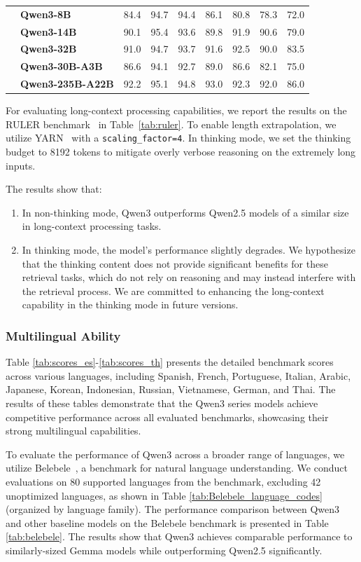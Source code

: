 \begin{table}[h]
\begin{tabular}{@{}cllllllll@{}}
& \textbf{Qwen3-8B} & 84.4 & 94.7 & 94.4 & 86.1 & 80.8 & 78.3 & 72.0 \\
& \textbf{Qwen3-14B} & 90.1 & 95.4 & 93.6 & 89.8 & 91.9 & 90.6 & 79.0 \\
& \textbf{Qwen3-32B} & 91.0 & 94.7 & 93.7 & 91.6 & 92.5 & 90.0 & 83.5 \\
& \textbf{Qwen3-30B-A3B} & 86.6 & 94.1 & 92.7 & 89.0 & 86.6 & 82.1 & 75.0 \\
& \textbf{Qwen3-235B-A22B} & 92.2 & 95.1 & 94.8 & 93.0 & 92.3 & 92.0 & 86.0 \\
\bottomrule
\end{tabular}
\end{table}

For evaluating long-context processing capabilities, we report the results on the RULER benchmark~\citep{hsieh2024ruler} in Table~\ref{tab:ruler}. To enable length extrapolation, we utilize YARN~\citep{yarn} with a \texttt{scaling\_factor=4}. In thinking mode, we set the thinking budget to 8192 tokens to mitigate overly verbose reasoning on the extremely long inputs.

The results show that:
\begin{enumerate}
    \item In non-thinking mode, Qwen3 outperforms Qwen2.5 models of a similar size in long-context processing tasks.
    \item In thinking mode, the model's performance slightly degrades. We hypothesize that the thinking content does not provide significant benefits for these retrieval tasks,  which do not rely on reasoning and may instead interfere with the retrieval process. We are committed to enhancing the long-context capability in the thinking mode in future versions.
\end{enumerate}


\subsubsection{Multilingual Ability}
Table \ref{tab:scores_es}-\ref{tab:scores_th} presents the detailed benchmark scores across various languages, including Spanish, French, Portuguese, Italian, Arabic, Japanese, Korean, Indonesian, Russian, Vietnamese, German, and Thai. The results of these tables demonstrate that the Qwen3 series models achieve competitive performance across all evaluated benchmarks, showcasing their strong multilingual capabilities.

To evaluate the performance of Qwen3 across a broader range of languages, we utilize Belebele~\citep{belebele}, a benchmark for natural language understanding. We conduct evaluations on 80 supported languages from the benchmark, excluding 42 unoptimized languages, as shown in Table \ref{tab:Belebele_language_codes} (organized by language family). The performance comparison between Qwen3 and other baseline models on the Belebele benchmark is presented in Table \ref{tab:belebele}. The results show that Qwen3 achieves comparable performance to similarly-sized Gemma models while outperforming Qwen2.5 significantly. 


